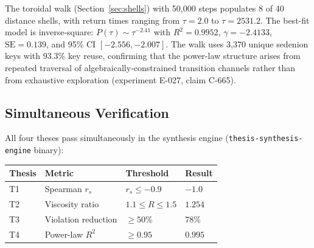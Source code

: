 \documentclass[12pt]{article}
\theoremstyle{definition}
\theoremstyle{plain}
\theoremstyle{remark}
\begin{document}
The toroidal walk (Section~\ref{sec:shells}) with 50{,}000 steps populates
8 of 40 distance shells, with return times ranging from $\tau = 2.0$ to
$\tau = 2531.2$.  The best-fit model is inverse-square:
$P(\tau) \sim \tau^{-2.41}$ with $R^2 = 0.9952$, $\gamma = -2.4133$,
$\mathrm{SE} = 0.139$, and 95\% CI $[-2.556, -2.007]$.  The walk uses
3{,}370 unique sedenion keys with 93.3\% key reuse, confirming that the
power-law structure arises from repeated traversal of
algebraically-constrained transition channels rather than from exhaustive
exploration (experiment E-027, claim C-665).

\subsection{Simultaneous Verification}
\label{sec:simultaneous}

All four theses pass simultaneously in the synthesis engine
(\texttt{thesis-synthesis-engine} binary):
\begin{center}
\begin{tabular}{llll}
\toprule
\textbf{Thesis} & \textbf{Metric} & \textbf{Threshold} & \textbf{Result} \\
\midrule
T1 & Spearman $r_s$ & $r_s \leq -0.9$ & $-1.0$ \\
T2 & Viscosity ratio & $1.1 \leq R \leq 1.5$ & $1.254$ \\
T3 & Violation reduction & $\geq 50\%$ & $78\%$ \\
T4 & Power-law $R^2$ & $\geq 0.95$ & $0.995$ \\
\bottomrule
\end{tabular}
\end{center}
\end{document}
